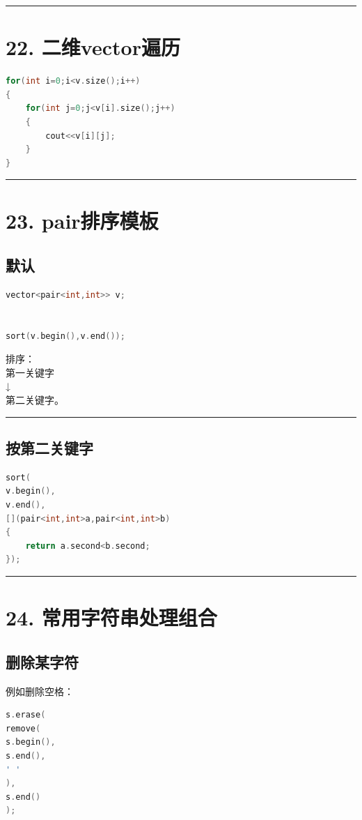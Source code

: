 \documentclass[10pt,twocolumn]{extarticle}
\begin{document}
\noindent\rule{\linewidth}{0.4pt}

\section{22. 二维vector遍历}
\begin{lstlisting}[language=C++]
for(int i=0;i<v.size();i++)
{
    for(int j=0;j<v[i].size();j++)
    {
        cout<<v[i][j];
    }
}
\end{lstlisting}

\noindent\rule{\linewidth}{0.4pt}

\section{23. pair排序模板}

\subsection{默认}
\begin{lstlisting}[language=C++]
vector<pair<int,int>> v;


sort(v.begin(),v.end());
\end{lstlisting}
排序：\\
第一关键字\\
↓\\
第二关键字。

\noindent\rule{\linewidth}{0.4pt}

\subsection{按第二关键字}
\begin{lstlisting}[language=C++]
sort(
v.begin(),
v.end(),
[](pair<int,int>a,pair<int,int>b)
{
    return a.second<b.second;
});
\end{lstlisting}

\noindent\rule{\linewidth}{0.4pt}

\section{24. 常用字符串处理组合}

\subsection{删除某字符}
例如删除空格：
\begin{lstlisting}[language=C++]
s.erase(
remove(
s.begin(),
s.end(),
' '
),
s.end()
);
\end{lstlisting}
\end{document}
